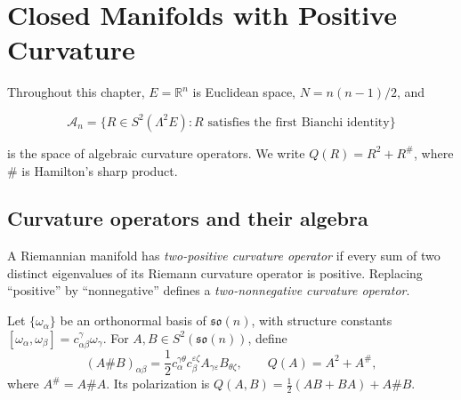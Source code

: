 \chapter{Closed Manifolds with Positive Curvature}
\label{ch:chow-ii-closed-positive-curvature}

Throughout this chapter, \(E=\mathbb R^n\) is Euclidean space,
\(N=n(n-1)/2\), and

\[
  \mathcal A_n=\{R\in S^2(\Lambda^2E):R\text{ satisfies the first Bianchi identity}\}
\]

is the space of algebraic curvature operators.  We write
\(Q(R)=R^2+R^\#\), where \(\#\) is Hamilton's sharp product.

\section{Curvature operators and their algebra}

\begin{definition}
  \label{def:chow-ii-two-positive-curvature-operator}
  A Riemannian manifold has \emph{two-positive curvature operator} if every
  sum of two distinct eigenvalues of its Riemann curvature operator is
  positive.  Replacing ``positive'' by ``nonnegative'' defines a
  \emph{two-nonnegative curvature operator}.
\end{definition}

\begin{definition}
  \label{def:chow-ii-sharp-product}
  Let \(\{\omega_\alpha\}\) be an orthonormal basis of \(\mathfrak{so}(n)\),
  with structure constants
  \([\omega_\alpha,\omega_\beta]=c_{\alpha\beta}^{\gamma}\omega_\gamma\).
  For \(A,B\in S^2(\mathfrak{so}(n))\), define
  \[
    (A\#B)_{\alpha\beta}
      =\frac12c_{\alpha}^{\gamma\theta}c_{\beta}^{\varepsilon\zeta}
        A_{\gamma\varepsilon}B_{\theta\zeta},
    \qquad Q(A)=A^2+A^\#,
  \]
  where \(A^\#=A\#A\).  Its polarization is
  \(Q(A,B)=\tfrac12(AB+BA)+A\#B\).
\end{definition}

